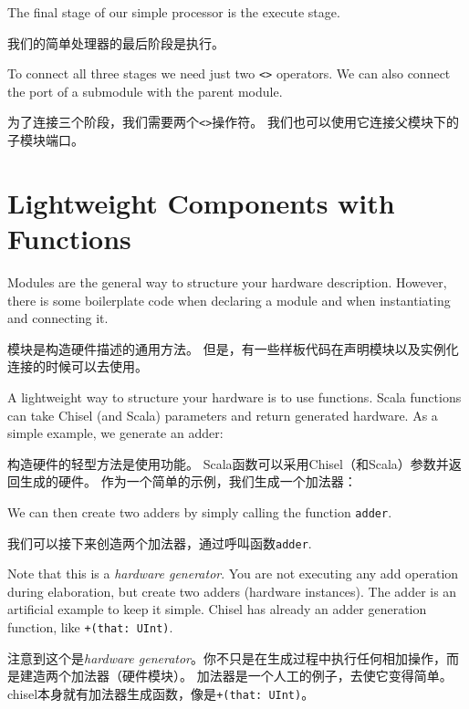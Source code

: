 \documentclass[%
    10pt,
    headinclude, footexclude,
    openright, %
    notitlepage,
    cleardoubleempty,
    headsepline,
    pointlessnumbers,
    bibtotoc, idxtotoc,
    ]{scrbook}
\newcommand{\code}[1]{{\small{\texttt{#1}}}}
\begin{document}

\noindent The final stage of our simple processor is the execute stage.

\noindent 我们的简单处理器的最后阶段是执行。


To connect all three stages we need just two \code{<>} operators.
We can also connect the port of a submodule with the parent module.

为了连接三个阶段，我们需要两个\code{<>}操作符。
我们也可以使用它连接父模块下的子模块端口。




\section{Lightweight Components with Functions}

Modules are the general way to structure your hardware description.
However, there is some boilerplate code when declaring a module and when instantiating and
connecting it.


模块是构造硬件描述的通用方法。
但是，有一些样板代码在声明模块以及实例化连接的时候可以去使用。

A lightweight way to structure your hardware is to use functions.
Scala functions can take Chisel (and Scala) parameters and return generated hardware.
As a simple example, we generate an adder:

构造硬件的轻型方法是使用功能。
Scala函数可以采用Chisel（和Scala）参数并返回生成的硬件。
作为一个简单的示例，我们生成一个加法器：


\noindent We can then create two adders by simply calling the function \code{adder}.

\noindent 我们可以接下来创造两个加法器，通过呼叫函数\code{adder}.


\noindent Note that this is a \emph{hardware generator}. You are not executing any add operation
during elaboration, but create two adders (hardware instances). The adder is an artificial example
to keep it simple. Chisel has already an adder generation function, like \code{+(that: UInt)}.

\noindent 注意到这个是\emph{hardware generator}。你不只是在生成过程中执行任何相加操作，而是建造两个加法器（硬件模块）。
加法器是一个人工的例子，去使它变得简单。chisel本身就有加法器生成函数，像是\code{+(that: UInt)}。
\end{document}
